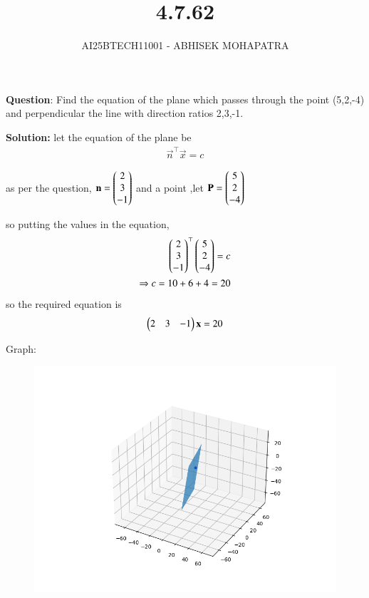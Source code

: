 \documentclass[journal,12pt,onecolumn]{IEEEtran}
\begin{document}
\title{4.7.62}
\author{AI25BTECH11001 - ABHISEK MOHAPATRA}
{\let\newpage\relax\maketitle}
	 	\textbf{Question}:
Find the equation of the plane which passes through the point (5,2,-4) and perpendicular the line with direction ratios 2,3,-1.


		\textbf{Solution:} let the equation of the plane be 
\begin{align}
		\vec{n}^\top\vec{x} = c
\end{align}

as per the question, $\mathbf{n} = \begin{pmatrix}2\\3\\-1\end{pmatrix}$ and a point ,let $\mathbf{P} = \begin{pmatrix}5\\2\\-4\end{pmatrix}$ 

so putting the values in the equation,
\begin{align}
		\begin{pmatrix}2\\3\\-1\end{pmatrix}^\top\begin{pmatrix}5\\2\\-4\end{pmatrix} = c\\
		\Rightarrow c = 10 + 6 +4 = 20
\end{align}
so the required equation is
\begin{align}
		\begin{pmatrix}2&3&-1\end{pmatrix}\mathbf{x} = 20
\end{align}

Graph:
\begin{figure}[h!]
	\centering
	\includegraphics[width=0.7\linewidth]{img.png}
\end{figure}
\end{document}
